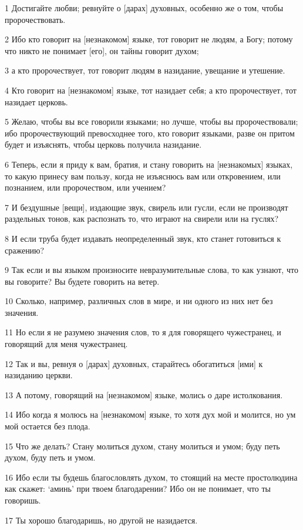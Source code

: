 \par 1 Достигайте любви; ревнуйте о [дарах] духовных, особенно же о том, чтобы пророчествовать.
\par 2 Ибо кто говорит на [незнакомом] языке, тот говорит не людям, а Богу; потому что никто не понимает [его], он тайны говорит духом;
\par 3 а кто пророчествует, тот говорит людям в назидание, увещание и утешение.
\par 4 Кто говорит на [незнакомом] языке, тот назидает себя; а кто пророчествует, тот назидает церковь.
\par 5 Желаю, чтобы вы все говорили языками; но лучше, чтобы вы пророчествовали; ибо пророчествующий превосходнее того, кто говорит языками, разве он притом будет и изъяснять, чтобы церковь получила назидание.
\par 6 Теперь, если я приду к вам, братия, и стану говорить на [незнакомых] языках, то какую принесу вам пользу, когда не изъяснюсь вам или откровением, или познанием, или пророчеством, или учением?
\par 7 И бездушные [вещи], издающие звук, свирель или гусли, если не производят раздельных тонов, как распознать то, что играют на свирели или на гуслях?
\par 8 И если труба будет издавать неопределенный звук, кто станет готовиться к сражению?
\par 9 Так если и вы языком произносите невразумительные слова, то как узнают, что вы говорите? Вы будете говорить на ветер.
\par 10 Сколько, например, различных слов в мире, и ни одного из них нет без значения.
\par 11 Но если я не разумею значения слов, то я для говорящего чужестранец, и говорящий для меня чужестранец.
\par 12 Так и вы, ревнуя о [дарах] духовных, старайтесь обогатиться [ими] к назиданию церкви.
\par 13 А потому, говорящий на [незнакомом] языке, молись о даре истолкования.
\par 14 Ибо когда я молюсь на [незнакомом] языке, то хотя дух мой и молится, но ум мой остается без плода.
\par 15 Что же делать? Стану молиться духом, стану молиться и умом; буду петь духом, буду петь и умом.
\par 16 Ибо если ты будешь благословлять духом, то стоящий на месте простолюдина как скажет: `аминь' при твоем благодарении? Ибо он не понимает, что ты говоришь.
\par 17 Ты хорошо благодаришь, но другой не назидается.

